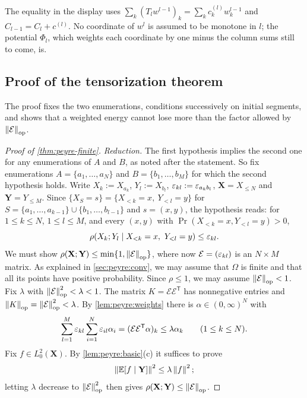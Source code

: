 \noindent The equality in the display uses
$\sum_k(T_lw^{l-1})_k=\sum_kc_k^{(l)}w_k^{l-1}$ and $C_{l-1}=C_l+c^{(l)}$.
No coordinate of $w^l$ is assumed to be monotone in $l$; the potential
$\Phi_l$, which weights each coordinate by one minus the column sums still to
come, is.

\subsection{Proof of the tensorization theorem}

The proof fixes the two enumerations, conditions successively on
initial segments, and shows that a weighted energy cannot lose
more than the factor allowed by $\left\|\mathcal E\right\|_{\mathrm{op}}$.

\begin{proof}[Proof of \cref{thm:peyre-finite}]
\emph{Reduction.} The first hypothesis implies the second one for any
enumerations of $A$ and $B$, as noted after the statement. So fix
enumerations $A=\{a_1,\dots,a_N\}$ and $B=\{b_1,\dots,b_M\}$ for which the
second hypothesis holds. Write $X_k:=X_{a_k}$, $Y_l:=X_{b_l}$,
$\varepsilon_{kl}:=\varepsilon_{a_kb_l}$, $\mathbf X=X_{\le N}$ and $\mathbf Y=Y_{\le M}$.
Since $\{X_S=s\}=\{X_{<k}=x,\ Y_{<l}=y\}$ for
$S=\{a_1,\dots,a_{k-1}\}\cup\{b_1,\dots,b_{l-1}\}$ and $s=(x,y)$, the
hypothesis reads: for $1\le k\le N$, $1\le l\le M$, and every $(x,y)$ with
$\Pr(X_{<k}=x,Y_{<l}=y)>0$,
\begin{equation}\label{eq:peyre:H}
  \rho(X_k;Y_l\mid X_{<k}=x,\ Y_{<l}=y)\le\varepsilon_{kl}.
\end{equation}
We must show $\rho(\mathbf X;\mathbf Y)\le\min\{1,\left\|\mathcal E\right\|_{\mathrm{op}}\}$,
where now $\mathcal E=(\varepsilon_{kl})$ is an $N\times M$ matrix. As explained in
\cref{sec:peyre:conv}, we may assume that $\Omega$ is finite and that all
its points have positive probability. Since $\rho\le1$, we may assume
$\left\|\mathcal E\right\|_{\mathrm{op}}<1$. Fix $\lambda$ with $\left\|\mathcal E\right\|_{\mathrm{op}}^2<\lambda<1$.
The matrix $K=\mathcal E\mathcal E^{\mathsf T}$ has nonnegative entries and
$\left\|K\right\|_{\mathrm{op}}=\left\|\mathcal E\right\|_{\mathrm{op}}^2<\lambda$. By \cref{lem:peyre:weights} there
is $\alpha\in(0,\infty)^N$ with
\begin{equation}\label{eq:peyre:alpha}
  \sum_{l=1}^M\varepsilon_{kl}\sum_{i=1}^N\varepsilon_{il}\alpha_i
  =(\mathcal E\mathcal E^{\mathsf T}\alpha)_k\le\lambda\alpha_k
  \qquad(1\le k\le N).
\end{equation}
Fix $f\in L^2_0(\mathbf X)$. By \cref{lem:peyre:basic}(c) it suffices to
prove
\begin{equation}\label{eq:peyre:goal}
  \left\|\mathbb E[f\mid\mathbf Y]\right\|^2\le\lambda\left\|f\right\|^2 ;
\end{equation}
letting $\lambda$ decrease to $\left\|\mathcal E\right\|_{\mathrm{op}}^2$ then gives
$\rho(\mathbf X;\mathbf Y)\le\left\|\mathcal E\right\|_{\mathrm{op}}$.


\end{proof}
